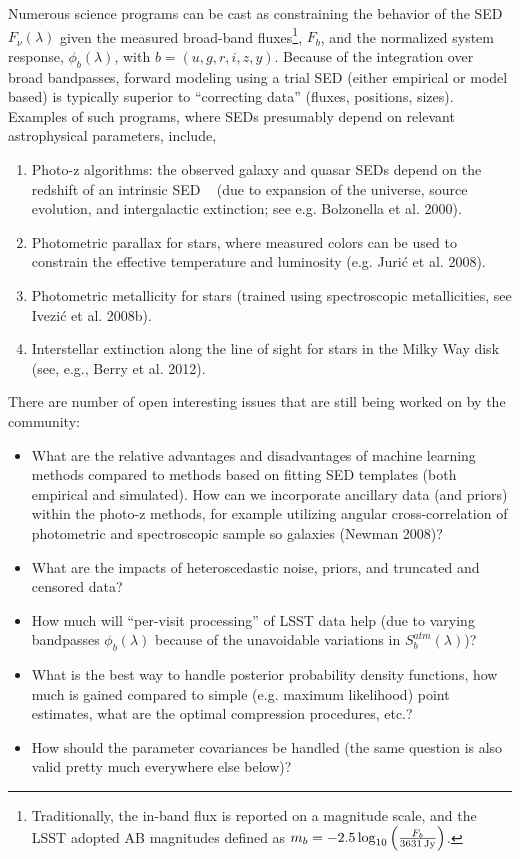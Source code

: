 \documentclass{iau}
\begin{document}
Numerous science programs can be cast as constraining the behavior of the SED 
$F_\nu(\lambda)$ given the measured broad-band fluxes\footnote{Traditionally, the in-band flux is 
reported on a magnitude scale, and the LSST adopted AB magnitudes defined as 
$m_b = -2.5\log_{10}\left({F_b \over 3631 \, {\rm Jy}}\right)$.}, $F_b$, and the 
normalized system response, $\phi_b(\lambda)$, with
$b=(u,g,r,i,z,y)$. Because of the integration 
over broad bandpasses, forward modeling using a trial SED (either empirical or model based) is 
typically superior to ``correcting data'' (fluxes, positions, sizes). Examples of such programs, 
where SEDs presumably depend on relevant astrophysical parameters, include, 
\begin{enumerate}
\item Photo-z algorithms: the observed galaxy and quasar SEDs depend on the redshift of an intrinsic SED  
(due to expansion of the universe, source evolution, and intergalactic extinction; see e.g. Bolzonella et al. 2000). 
\item Photometric parallax for stars, where measured colors can be used to constrain the effective
          temperature  and luminosity (e.g. Juri\'{c} et al. 2008). 
\item Photometric metallicity for stars (trained using spectroscopic metallicities, see Ivezi\'{c} et al. 2008b). 
\item Interstellar extinction along the line of sight for stars in the Milky Way disk (see, e.g., Berry et al. 2012). 
\end{enumerate}

There are number of open interesting issues that are still being worked on by the community: 
\begin{itemize}
\item What are the relative advantages and disadvantages of machine
  learning methods compared to methods based on fitting
          SED templates (both empirical and simulated). How can we
          incorporate ancillary data (and priors) within the photo-z
          methods, for example utilizing angular cross-correlation of 
         photometric and spectroscopic sample so galaxies (Newman 2008)? 
\item What are the impacts of heteroscedastic noise, priors, and truncated and censored data? 
\item How much will ``per-visit processing'' of LSST data help (due to varying bandpasses $\phi_b(\lambda)$ 
          because of the unavoidable variations in $S_b^{atm}(\lambda)$)? 
\item What is the best way to handle posterior probability density functions, how much is gained compared 
         to simple (e.g. maximum likelihood) point estimates, what are the optimal compression procedures, etc.?  
\item How should the parameter covariances be handled (the same question is also valid pretty much everywhere 
          else below)? 
\end{itemize}
\end{document}
